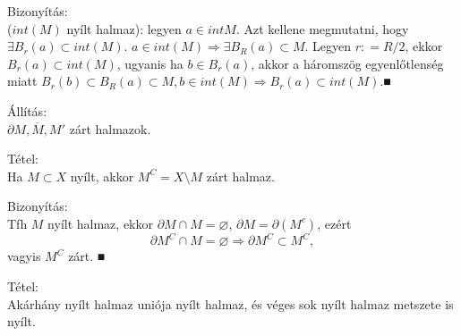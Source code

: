 \documentclass[12pt,a4paper]{scrartcl}
\newenvironment{tetel}{}{}
\newenvironment{bizonyitas}{}{}
\newenvironment{allitas}{}{}
\begin{document}
\begin{bizonyitas}

Bizonyítás:\\
(\({int}\left( M \right)\) nyílt halmaz): legyen \(a \in {int}M\). Azt
kellene megmutatni, hogy
\(\exists B_{r}\left( a \right) \subset {int}\left( M \right)\).
\(\left. a \in {int}\left( M \right)\Rightarrow\exists B_{R}\left( a \right) \subset M \right.\).
Legyen \(r: = R/2\), ekkor
\(B_{r}\left( a \right) \subset {int}\left( M \right)\), ugyanis ha
\(b \in B_{r}\left( a \right)\), akkor a háromszög egyenlőtlenség miatt
\(\left. B_{r}\left( b \right) \subset B_{R}\left( a \right) \subset M,b \in {int}\left( M \right)\Rightarrow B_{r}\left( a \right) \subset {int}\left( M \right) \right.\).■

\end{bizonyitas}

\begin{allitas}

Állítás:\\
\(\partial M,\overline{M},M'\) zárt halmazok.

\end{allitas}

\begin{tetel}

Tétel:\\
Ha \(M \subset X\) nyílt, akkor \(M^{C} = X\text{\textbackslash}M\) zárt
halmaz.

\end{tetel}

\begin{bizonyitas}

Bizonyítás:\\
Tfh \(M\) nyílt halmaz, ekkor \(\partial M \cap M = \varnothing\),
\(\partial M = \partial\left( M^{c} \right)\), ezért
\[\left. \partial M^{C} \cap M = \varnothing\Rightarrow\partial M^{C} \subset M^{C} \right.,\]
vagyis \(M^{C}\) zárt. ■

\end{bizonyitas}

\begin{tetel}

Tétel:\\
Akárhány nyílt halmaz uniója nyílt halmaz, és véges sok nyílt halmaz
metszete is nyílt.

\end{tetel}
\end{document}
